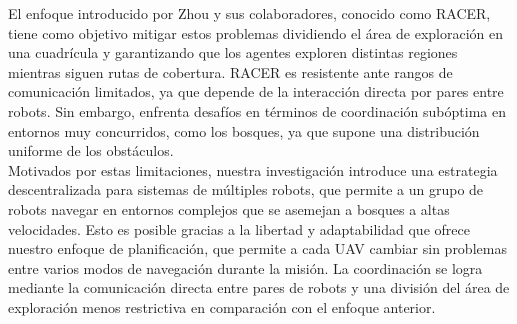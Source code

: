 \documentclass[sigconf]{acmart}
\begin{document}
El enfoque introducido por Zhou y sus colaboradores, conocido como RACER, tiene como objetivo mitigar estos problemas dividiendo el área de exploración en una cuadrícula y garantizando que los agentes exploren distintas regiones mientras siguen rutas de cobertura. RACER es resistente ante rangos de comunicación limitados, ya que depende de la interacción directa por pares entre robots. Sin embargo, enfrenta desafíos en términos de coordinación subóptima en entornos muy concurridos, como los bosques, ya que supone una distribución uniforme de los obstáculos.\\

Motivados por estas limitaciones, nuestra investigación introduce una estrategia descentralizada para sistemas de múltiples robots, que permite a un grupo de robots navegar en entornos complejos que se asemejan a bosques a altas velocidades. Esto es posible gracias a la libertad y adaptabilidad que ofrece nuestro enfoque de planificación, que permite a cada UAV cambiar sin problemas entre varios modos de navegación durante la misión. La coordinación se logra mediante la comunicación directa entre pares de robots y una división del área de exploración menos restrictiva en comparación con el enfoque anterior.\\





\end{document}
